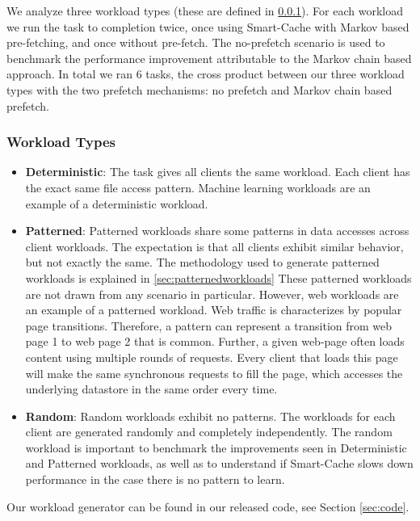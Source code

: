 \documentclass[sigconf]{acmart}
\begin{document}
We analyze three workload types (these are defined in \ref{subsubsection:workloads}). For each workload we run the task to completion twice, once using Smart-Cache with Markov based pre-fetching, and once without pre-fetch. The no-prefetch scenario is used to benchmark the performance improvement attributable to the Markov chain based approach. In total we ran 6 tasks, the cross product between our three workload types with the two prefetch mechanisms: no prefetch and Markov chain based prefetch.

 
\subsubsection{Workload Types}
\label{subsubsection:workloads}
\begin{itemize}
    \item \textbf{Deterministic}: The task gives all clients the same workload. Each client has the exact same file access pattern. Machine learning workloads are an example of a deterministic workload.

     \item \textbf{Patterned}: Patterned workloads share some patterns in data accesses across client workloads. The expectation is that all clients exhibit similar behavior, but not exactly the same. The methodology used to generate patterned workloads is explained in \ref{sec:patternedworkloads} 
     These patterned workloads are not drawn from any scenario in particular. However, web workloads are an example of a patterned workload. Web traffic is characterizes by popular page transitions. Therefore, a pattern can represent a transition from web page 1 to web page 2 that is common. Further, a given web-page often loads content using multiple rounds of requests. Every client that loads this page will make the same synchronous requests to fill the page, which accesses the underlying datastore in the same order every time.
    
    \item \textbf{Random}: Random workloads exhibit no patterns. The workloads for each client are generated randomly and completely independently. The random workload is important to benchmark the improvements seen in Deterministic and Patterned workloads, as well as to understand if Smart-Cache slows down performance in the case there is no pattern to learn.
\end{itemize}

Our workload generator can be found in our released code, see Section \ref{sec:code}.
\end{document}
